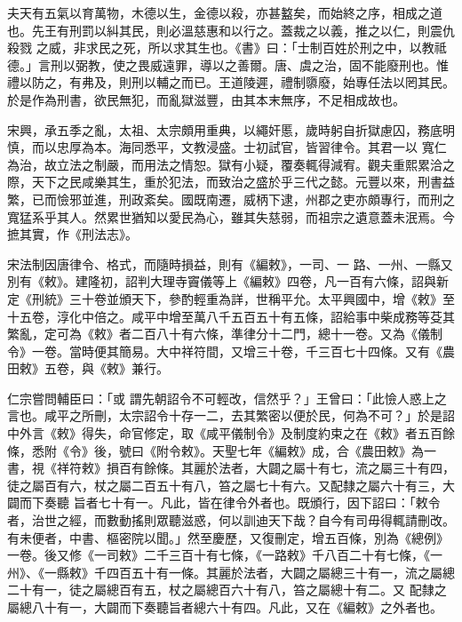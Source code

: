 
\begin{pinyinscope}

 夫天有五氣以育萬物，木德以生，金德以殺，亦甚盭矣，而始終之序，相成之道也。先王有刑罰以糾其民，則必溫慈惠和以行之。蓋裁之以義，推之以仁，則震仇殺戮
 之威，非求民之死，所以求其生也。《書》曰：「士制百姓於刑之中，以教祗德。」言刑以弼教，使之畏威遠罪，導以之善爾。唐、虞之治，固不能廢刑也。惟禮以防之，有弗及，則刑以輔之而已。王道陵遲，禮制隳廢，始專任法以罔其民。於是作為刑書，欲民無犯，而亂獄滋豐，由其本末無序，不足相成故也。



 宋興，承五季之亂，太祖、太宗頗用重典，以繩奸慝，歲時躬自折獄慮囚，務底明慎，而以忠厚為本。海同悉平，文教浸盛。士初試官，皆習律令。其君一以
 寬仁為治，故立法之制嚴，而用法之情恕。獄有小疑，覆奏輒得減宥。觀夫重熙累洽之際，天下之民咸樂其生，重於犯法，而致治之盛於乎三代之懿。元豐以來，刑書益繁，已而憸邪並進，刑政紊矣。國既南遷，威柄下逮，州郡之吏亦頗專行，而刑之寬猛系乎其人。然累世猶知以愛民為心，雖其失慈弱，而祖宗之遺意蓋未泯焉。今摭其實，作《刑法志》。



 宋法制因唐律令、格式，而隨時損益，則有《編敕》，一司、一
 路、一州、一縣又別有《敕》。建隆初，詔判大理寺竇儀等上《編敕》四卷，凡一百有六條，詔與新定《刑統》三十卷並頒天下，參酌輕重為詳，世稱平允。太平興國中，增《敕》至十五卷，淳化中倍之。咸平中增至萬八千五百五十有五條，詔給事中柴成務等芟其繁亂，定可為《敕》者二百八十有六條，準律分十二門，總十一卷。又為《儀制令》一卷。當時便其簡易。大中祥符間，又增三十卷，千三百七十四條。又有《農田敕》五卷，與《敕》兼行。



 仁宗嘗問輔臣曰：「或
 謂先朝詔令不可輕改，信然乎？」王曾曰：「此憸人惑上之言也。咸平之所刪，太宗詔令十存一二，去其繁密以便於民，何為不可？」於是詔中外言《敕》得失，命官修定，取《咸平儀制令》及制度約束之在《敕》者五百餘條，悉附《令》後，號曰《附令敕》。天聖七年《編敕》成，合《農田敕》為一書，視《祥符敕》損百有餘條。其麗於法者，大闢之屬十有七，流之屬三十有四，徒之屬百有六，杖之屬二百五十有八，笞之屬七十有六。又配隸之屬六十有三，大闢而下奏聽
 旨者七十有一。凡此，皆在律令外者也。既頒行，因下詔曰：「敕令者，治世之經，而數動搖則眾聽滋惑，何以訓迪天下哉？自今有司毋得輒請刪改。有未便者，中書、樞密院以聞。」然至慶歷，又復刪定，增五百條，別為《總例》一卷。後又修《一司敕》二千三百十有七條，《一路敕》千八百二十有七條，《一州》、《一縣敕》千四百五十有一條。其麗於法者，大闢之屬總三十有一，流之屬總二十有一，徒之屬總百有五，杖之屬總百六十有八，笞之屬總十有二。又
 配隸之屬總八十有一，大闢而下奏聽旨者總六十有四。凡此，又在《編敕》之外者也。




\end{pinyinscope}
